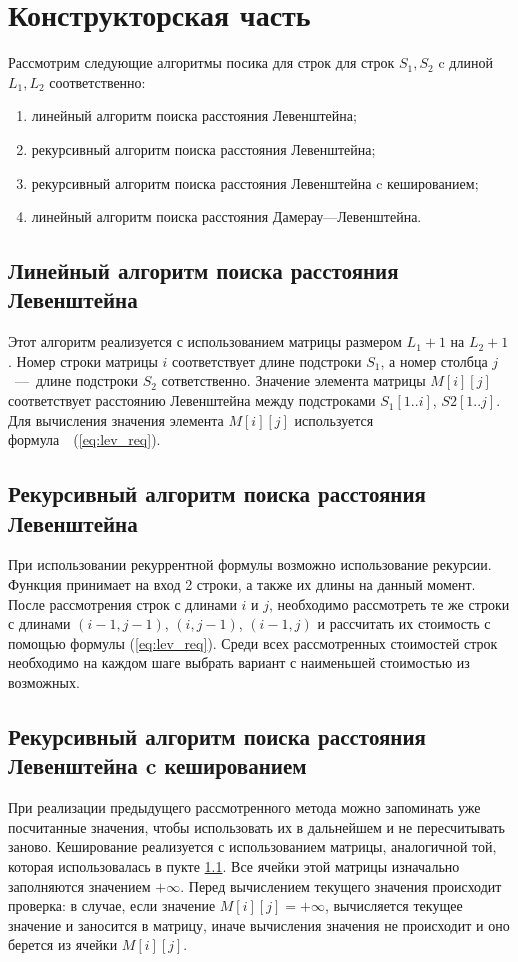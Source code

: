 \chapter{Конструкторская часть}
\normalsize
Рассмотрим следующие алгоритмы посика для строк для строк $S_1,S_2$  c длиной $L_1, L_2$ соответственно:
\begin{enumerate}
	\item линейный алгоритм поиска расстояния Левенштейна;
	\item рекурсивный алгоритм поиска расстояния Левенштейна;
	\item рекурсивный алгоритм поиска расстояния Левенштейна c кешированием;
	\item линейный алгоритм поиска расстояния Дамерау---Левенштейна.
\end{enumerate}

\section{Линейный алгоритм поиска расстояния Левенштейна}
\label{subsec:levenshteinDistanceSimple}
Этот алгоритм реализуется с использованием матрицы размером $L_1 + 1$ на $L_2 + 1$. Номер строки матрицы $i$ соответствует длине подстроки $S_1$, а номер столбца $j$~---~длине подстроки $S_2$ сответственно. Значение элемента матрицы $M[i][j]$ соответствует расстоянию Левенштейна между подстроками $S_1[1..i]$, $S2[1..j]$. Для вычисления значения элемента $M[i][j]$ используется формула~~(\ref{eq:lev_req}).


\section{Рекурсивный алгоритм поиска расстояния Левенштейна}
\label{subsec:levenshteinDistanceRecurcive}
При использовании рекуррентной формулы возможно использование рекурсии. Функция принимает на вход 2 строки, а также их длины на данный момент. После рассмотрения строк с длинами $i$ и $j$, необходимо рассмотреть те же строки с длинами $(i-1, j-1)$, $(i, j-1)$, $(i-1, j)$ и рассчитать их стоимость с помощью формулы (\ref{eq:lev_req}). Среди всех рассмотренных стоимостей строк необходимо на каждом шаге выбрать вариант с наименьшей стоимостью из возможных.

\section{Рекурсивный алгоритм поиска расстояния Левенштейна c кешированием}
\label{subec:levenshteinDistanceRecurciveCache}
При реализации предыдущего рассмотренного метода можно запоминать уже посчитанные значения, чтобы использовать их в дальнейшем и не пересчитывать заново. Кеширование реализуется с использованием матрицы, аналогичной той, которая использовалась в пукте \ref{subsec:levenshteinDistanceSimple}. Все ячейки этой матрицы изначально заполняются значением $+\infty$. Перед вычислением текущего значения происходит проверка: в случае, если значение $M[i][j] = +\infty$, вычисляется текущее значение и заносится в матрицу, иначе
вычисления значения не происходит и оно берется из ячейки $M[i][j]$.


